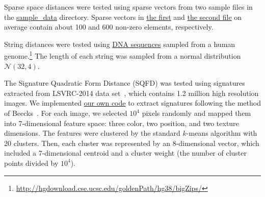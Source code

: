 \documentclass[runningheads,a4paper]{llncs}
\newcommand{\replocfile}{https://github.com/searchivarius/NonMetricSpaceLib/blob/pserv/}
\begin{document}
{Sparse space distances were tested using sparse vectors from two sample files in the
\href{\replocfile sample_data}{sample\_data} directory.
Sparse vectors in 
\href{\replocfile sample_data/sparse_5K.txt}{the first} 
and
\href{\replocfile sample_data/sparse_wiki_5K.txt}{the second file} on average contain
about 100 and 600 non-zero elements, respectively.

String distances were tested using \href{\replocfile sample_data/dna32_4_5K.txt}{DNA sequences} sampled from a human genome.\footnote{\url{http://hgdownload.cse.ucsc.edu/goldenPath/hg38/bigZips/}}
The length of each string was sampled from a normal distribution $\mathcal{N}(32,4)$. 

The Signature Quadratic Form Distance (SQFD) \cite{Beecks:2010,Beecks:2013} was tested 
using signatures extracted from LSVRC-2014 data set~\cite{ILSVRCarxiv14}, 
which contains 1.2 million high resolution images.
We implemented \href{\replocfile data/data\_conv/sqfd}{our own code} to extract signatures following the method of Beecks~\cite{Beecks:2013}.
For each image, we selected $10^4$ pixels randomly and
mapped them into 7-dimensional feature space:
three color, two position, and two texture dimensions.
The features were clustered by the standard $k$-means algorithm with 20 clusters.
Then, each cluster was represented by an 8-dimensional vector, which included
a 7-dimensional centroid and a cluster weight (the number of cluster points divided
by $10^4$).

}
\end{document}
